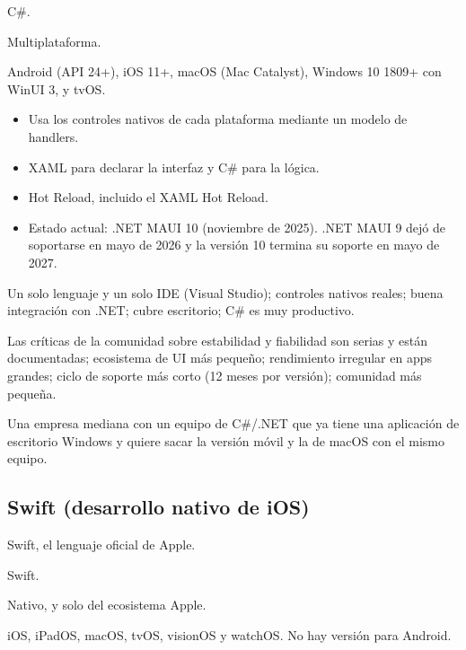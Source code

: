  C\#.

 Multiplataforma.

 Android (API 24+), iOS 11+, macOS (Mac Catalyst), Windows 10 1809+ con WinUI 3, y tvOS.

\begin{itemize}[leftmargin=*,itemsep=0.2em,topsep=0.2em]
  \item Usa los controles nativos de cada plataforma mediante un modelo de handlers.
  \item XAML para declarar la interfaz y C\# para la lógica.
  \item Hot Reload, incluido el XAML Hot Reload.
  \item Estado actual: .NET MAUI 10 (noviembre de 2025). .NET MAUI 9 dejó de soportarse en mayo de 2026 y la versión 10 termina su soporte en mayo de 2027.
\end{itemize}

 Un solo lenguaje y un solo IDE (Visual Studio); controles nativos reales; buena integración con .NET; cubre escritorio; C\# es muy productivo.

 Las críticas de la comunidad sobre estabilidad y fiabilidad son serias y están documentadas; ecosistema de UI más pequeño; rendimiento irregular en apps grandes; ciclo de soporte más corto (12 meses por versión); comunidad más pequeña.

 Una empresa mediana con un equipo de C\#/.NET que ya tiene una aplicación de escritorio Windows y quiere sacar la versión móvil y la de macOS con el mismo equipo.

\subsection{Swift (desarrollo nativo de iOS)}

 Swift, el lenguaje oficial de Apple.

 Swift.

 Nativo, y solo del ecosistema Apple.

 iOS, iPadOS, macOS, tvOS, visionOS y watchOS. No hay versión para Android.

